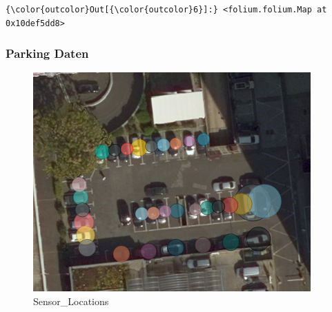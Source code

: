 \documentclass[11pt]{article}
\makeatletter
\def\maxwidth{\ifdim\Gin@nat@width>\linewidth\linewidth
    \else\Gin@nat@width\fi}
\let\Oldincludegraphics\includegraphics
\renewcommand{\includegraphics}[1]{\Oldincludegraphics[width=.8\maxwidth]{#1}}
\makeatother
\begin{document}
\begin{Verbatim}[commandchars=\\\{\}]
{\color{outcolor}Out[{\color{outcolor}6}]:} <folium.folium.Map at 0x10def5dd8>
\end{Verbatim}
            
    \subsubsection{Parking Daten}\label{parking-daten}

\begin{figure}
\centering
\includegraphics{images/0_parking_map.PNG}
\caption{Sensor\_Locations}
\end{figure}
\end{document}
